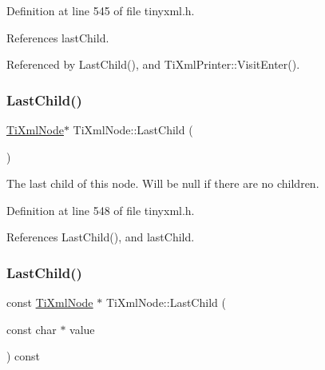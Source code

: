 Definition at line 545 of file tinyxml.\+h.



References last\+Child.



Referenced by Last\+Child(), and Ti\+Xml\+Printer\+::\+Visit\+Enter().

\hypertarget{class_ti_xml_node_a6432d2b2495f6caf9cb4278df706a031}{}\label{class_ti_xml_node_a6432d2b2495f6caf9cb4278df706a031} 
\subsubsection{\texorpdfstring{Last\+Child()}{LastChild()}\hspace{0.1cm}{\footnotesize\ttfamily [2/6]}}
{\footnotesize\ttfamily \hyperlink{class_ti_xml_node}{Ti\+Xml\+Node}$\ast$ Ti\+Xml\+Node\+::\+Last\+Child (\begin{DoxyParamCaption}{ }\end{DoxyParamCaption})\hspace{0.3cm}{\ttfamily [inline]}}



The last child of this node. Will be null if there are no children. 



Definition at line 548 of file tinyxml.\+h.



References Last\+Child(), and last\+Child.

\hypertarget{class_ti_xml_node_afdd7b6ba456fdd570610c1d841f91eb3}{}\label{class_ti_xml_node_afdd7b6ba456fdd570610c1d841f91eb3} 
\subsubsection{\texorpdfstring{Last\+Child()}{LastChild()}\hspace{0.1cm}{\footnotesize\ttfamily [3/6]}}
{\footnotesize\ttfamily const \hyperlink{class_ti_xml_node}{Ti\+Xml\+Node} $\ast$ Ti\+Xml\+Node\+::\+Last\+Child (\begin{DoxyParamCaption}\item[{const char $\ast$}]{value }\end{DoxyParamCaption}) const}



